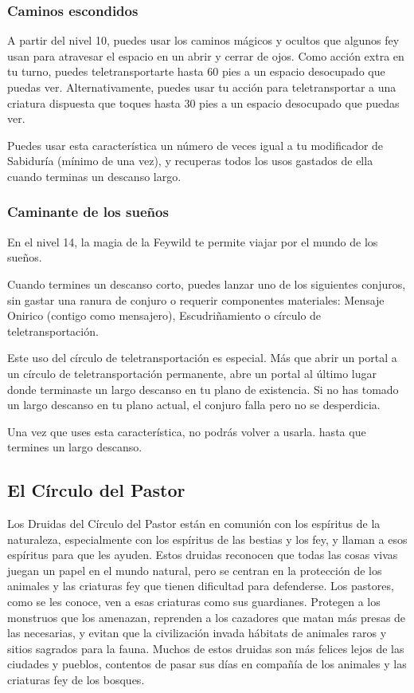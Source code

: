 \documentclass[a4paper,twocolumn,openany,10pt]{dndbook}
\begin{document}
\subsubsection{Caminos escondidos}
A partir del nivel 10, puedes usar los caminos mágicos y ocultos que algunos fey usan para atravesar el espacio en un abrir y
cerrar de ojos. Como acción extra en tu turno, puedes teletransportarte hasta 60 pies a un espacio desocupado que puedas ver.
Alternativamente, puedes usar tu acción para teletransportar a una criatura dispuesta que toques hasta 30 pies a un espacio
desocupado que puedas ver.

Puedes usar esta característica un número de veces igual a tu modificador de Sabiduría (mínimo de una vez), y recuperas todos
los usos gastados de ella cuando terminas un descanso largo.
 
\subsubsection{Caminante de los sueños}
En el nivel 14, la magia de la Feywild te permite viajar por el mundo de los sueños.

Cuando termines un descanso corto, puedes lanzar uno de los siguientes conjuros, sin gastar una ranura de conjuro o requerir
componentes materiales: Mensaje Onirico (contigo como mensajero), Escudriñamiento o círculo de teletransportación.

Este uso del círculo de teletransportación es especial. Más que abrir un portal a un círculo de teletransportación permanente,
abre un portal al último lugar donde terminaste un largo descanso en tu plano de existencia. Si no has tomado un largo descanso
en tu plano actual, el conjuro falla pero no se desperdicia.

Una vez que uses esta característica, no podrás volver a usarla. hasta que termines un largo descanso. 

\subsection{El Círculo del Pastor}
Los Druidas del Círculo del Pastor están en comunión con los espíritus de la naturaleza, especialmente con los espíritus de las
bestias y los fey, y llaman a esos espíritus para que les ayuden. Estos druidas reconocen que todas las cosas vivas juegan un
papel en el mundo natural, pero se centran en la protección de los animales y las criaturas fey que tienen dificultad para
defenderse. Los pastores, como se les conoce, ven a esas criaturas como sus guardianes. Protegen a los monstruos que los
amenazan, reprenden a los cazadores que matan más presas de las necesarias, y evitan que la civilización invada hábitats de
animales raros y sitios sagrados para la fauna. Muchos de estos druidas son más felices lejos de las ciudades y pueblos,
contentos de pasar sus días en compañía de los animales y las criaturas fey de los bosques.
\end{document}
